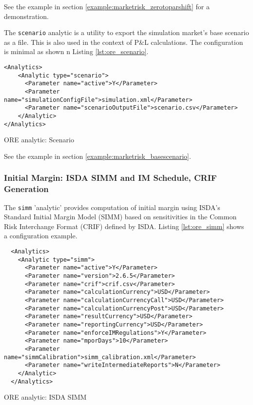 {See the example in section \ref{example:marketrisk_zerotoparshift} for a demonstration.

\medskip

The {\tt scenario} analytic is a utility to export the simulation market's base scenario as a file.
This is also used in the context of P\&L calculations. The configuration is minimal as shown
n Listing \ref{lst:ore_scenario}.

\begin{listing}[H]
\begin{verbatim}
<Analytics>
    <Analytic type="scenario">
      <Parameter name="active">Y</Parameter>
      <Parameter name="simulationConfigFile">simulation.xml</Parameter>
      <Parameter name="scenarioOutputFile">scenario.csv</Parameter>
    </Analytic>
</Analytics>
\end{verbatim}
\caption{ORE analytic: Scenario}
\label{lst:ore_scenario}
\end{listing}

See the example in section \ref{example:marketrisk_basescenario}.

\subsubsection{Initial Margin: ISDA SIMM and IM Schedule, CRIF Generation}

The {\tt simm} 'analytic' provides computation of initial margin using ISDA's Standard Initial Margin Model (SIMM)
based on sensitivities in the Common Risk Interchange Format (CRIF) defined by ISDA. Listing \ref{lst:ore_simm} shows
a configuration example.

\begin{listing}[H]
\begin{verbatim}
  <Analytics>
    <Analytic type="simm">
      <Parameter name="active">Y</Parameter>
      <Parameter name="version">2.6.5</Parameter>
      <Parameter name="crif">crif.csv</Parameter>
      <Parameter name="calculationCurrency">USD</Parameter>
      <Parameter name="calculationCurrencyCall">USD</Parameter>
      <Parameter name="calculationCurrencyPost">USD</Parameter>
      <Parameter name="resultCurrency">USD</Parameter>
      <Parameter name="reportingCurrency">USD</Parameter>
      <Parameter name="enforceIMRegulations">Y</Parameter>
      <Parameter name="mporDays">10</Parameter>
      <Parameter name="simmCalibration">simm_calibration.xml</Parameter>
      <Parameter name="writeIntermediateReports">N</Parameter>
    </Analytic>
  </Analytics>
\end{verbatim}
\caption{ORE analytic: ISDA SIMM}
\label{lst:ore_simm}
\end{listing}

}
